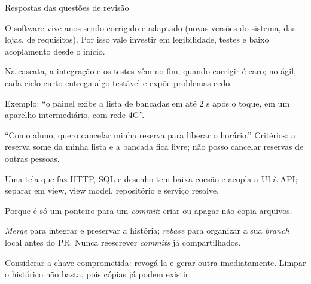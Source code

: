 \documentclass[aspectratio=169,10pt]{beamer}
\begin{document}
\begin{frame}{Respostas das questões de revisão}
  \begin{respostas}
    \item O software vive anos sendo corrigido e adaptado (novas versões do sistema, das lojas, de requisitos). Por isso vale investir em legibilidade, testes e baixo acoplamento desde o início.
    \item Na cascata, a integração e os testes vêm no fim, quando corrigir é caro; no ágil, cada ciclo curto entrega algo testável e expõe problemas cedo.
    \item Exemplo: ``o painel exibe a lista de bancadas em até 2 s após o toque, em um aparelho intermediário, com rede 4G''.
    \item ``Como aluno, quero cancelar minha reserva para liberar o horário.'' Critérios: a reserva some da minha lista e a bancada fica livre; não posso cancelar reservas de outras pessoas.
    \item Uma tela que faz HTTP, SQL e desenho tem baixa coesão e acopla a UI à API; separar em view, view model, repositório e serviço resolve.
    \item Porque é só um ponteiro para um \emph{commit}: criar ou apagar não copia arquivos.
    \item \emph{Merge} para integrar e preservar a história; \emph{rebase} para organizar a sua \emph{branch} local antes do PR. Nunca reescrever \emph{commits} já compartilhados.
    \item Considerar a chave comprometida: revogá-la e gerar outra imediatamente. Limpar o histórico não basta, pois cópias já podem existir.
  \end{respostas}
\end{frame}

\end{document}
